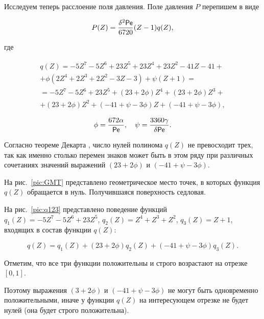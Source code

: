 
Исследуем теперь расслоение поля давления. Поле давления $P$ перепишем в виде

$$\displaystyle P(Z)= \frac{\delta^2 {\sf Pe}}{6720}(Z-1)q(Z),$$

где

\begin{multline}

q(Z)=-5Z^7-5Z^6+23Z^5+23Z^4+23Z^2-41Z-41

+

\\

+\phi\left(2Z^4+2Z^3+2Z^2-3Z-3\right)+\psi\left(Z+1\right)=

\\

=-5Z^7-5Z^6+23Z^5+(23+2\phi)Z^4+(23+2\phi)Z^3+

\\

+(23+2\phi)Z^2+(-41+\psi-3\phi)Z+(-41+\psi-3\phi),

\end{multline}

$$\displaystyle \phi=\frac{672\alpha}{\sf Pe}, \quad \psi=\frac{3360\gamma}{\delta {\sf Pe}}.$$





Согласно теореме Декарта \cite{Dekart}, число нулей полинома $q(Z)$ не превосходит трех, так как именно столько перемен знаков может быть в этом ряду при различных сочетаниях значений выражений $(23+2\phi)$ и $(-41+\psi-3\phi)$.



На рис.~\ref{pic:GMT} представлено геометрическое место точек, в которых функция $q(Z)$ обращается в нуль. Получившаяся поверхность седловая.

На рис.~\ref{pic:q123} представлено поведение функций $q_1(Z)= -5 Z^7 - 5 Z^6 + 23 Z^5$, $q_2(Z) = Z^4 + Z^3 + Z^2$, $q_3(Z) = Z + 1$, входящих в состав функции $q(Z)$:

$$

q(Z)=q_1(Z)+(23+2\phi) q_2(Z)+ (-41+\psi-3\phi)q_3(Z).

$$

 Отметим, что все три функции положительны и строго возрастают на отрезке $[0,1]$. 

 Поэтому выражения $(3+2\phi)$ и $(-41+\psi-3\phi)$ не могут быть одновременно положительными, иначе у функции $q(Z)$ на интересующем отрезке не будет нулей (она будет строго положительна).



